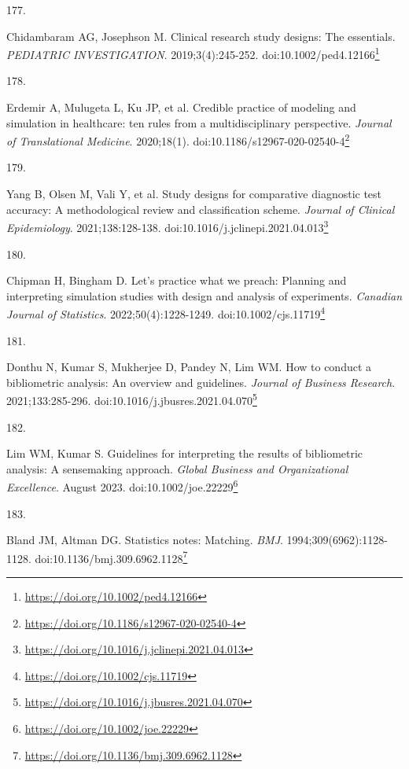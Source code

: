 \documentclass[
  a4paper,
]{book}
\newlength{\cslhangindent}
\newlength{\csllabelwidth}
\newlength{\cslentryspacingunit} %
\newenvironment{CSLReferences}[2] %
 {%
  \setlength{\parindent}{0pt}
  \ifodd #1
  \let\oldpar\par
  \def\par{\hangindent=\cslhangindent\oldpar}
  \fi
  \setlength{\parskip}{#2\cslentryspacingunit}
 }%
 {}
\newcommand{\CSLLeftMargin}[1]{\parbox[t]{\csllabelwidth}{#1}}
\newcommand{\CSLRightInline}[1]{\parbox[t]{\linewidth - \csllabelwidth}{#1}\break}
\renewcommand{\href}[2]{#2\footnote{\url{#1}}}
\begin{document}
\begin{CSLReferences}{0}{0}
\leavevmode{}%
\CSLLeftMargin{177. }%
\CSLRightInline{Chidambaram AG, Josephson M. Clinical research study designs: The essentials. \emph{PEDIATRIC INVESTIGATION}. 2019;3(4):245-252. doi:\href{https://doi.org/10.1002/ped4.12166}{10.1002/ped4.12166}}

\leavevmode{}%
\CSLLeftMargin{178. }%
\CSLRightInline{Erdemir A, Mulugeta L, Ku JP, et al. Credible practice of modeling and simulation in healthcare: ten rules from a multidisciplinary perspective. \emph{Journal of Translational Medicine}. 2020;18(1). doi:\href{https://doi.org/10.1186/s12967-020-02540-4}{10.1186/s12967-020-02540-4}}

\leavevmode{}%
\CSLLeftMargin{179. }%
\CSLRightInline{Yang B, Olsen M, Vali Y, et al. Study designs for comparative diagnostic test accuracy: A methodological review and classification scheme. \emph{Journal of Clinical Epidemiology}. 2021;138:128-138. doi:\href{https://doi.org/10.1016/j.jclinepi.2021.04.013}{10.1016/j.jclinepi.2021.04.013}}

\leavevmode{}%
\CSLLeftMargin{180. }%
\CSLRightInline{Chipman H, Bingham D. Let's practice what we preach: Planning and interpreting simulation studies with design and analysis of experiments. \emph{Canadian Journal of Statistics}. 2022;50(4):1228-1249. doi:\href{https://doi.org/10.1002/cjs.11719}{10.1002/cjs.11719}}

\leavevmode{}%
\CSLLeftMargin{181. }%
\CSLRightInline{Donthu N, Kumar S, Mukherjee D, Pandey N, Lim WM. How to conduct a bibliometric analysis: An overview and guidelines. \emph{Journal of Business Research}. 2021;133:285-296. doi:\href{https://doi.org/10.1016/j.jbusres.2021.04.070}{10.1016/j.jbusres.2021.04.070}}

\leavevmode{}%
\CSLLeftMargin{182. }%
\CSLRightInline{Lim WM, Kumar S. Guidelines for interpreting the results of bibliometric analysis: A sensemaking approach. \emph{Global Business and Organizational Excellence}. August 2023. doi:\href{https://doi.org/10.1002/joe.22229}{10.1002/joe.22229}}

\leavevmode{}%
\CSLLeftMargin{183. }%
\CSLRightInline{Bland JM, Altman DG. Statistics notes: Matching. \emph{BMJ}. 1994;309(6962):1128-1128. doi:\href{https://doi.org/10.1136/bmj.309.6962.1128}{10.1136/bmj.309.6962.1128}}


\end{CSLReferences}
\end{document}
